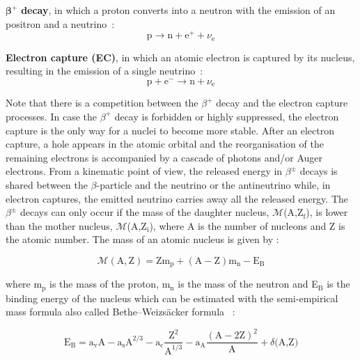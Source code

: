 \documentclass[main.tex]{subfiles}
\begin{document}
\bigskip


\NI $\boldsymbol{\beta^+}$ \textbf{decay}, in which a proton converts into a neutron with the emission of an positron and a neutrino~:
\begin{equation}
\text{p} \rightarrow \text{n} + \text{e}^+ + \nu_\text{e}
\end{equation}  


\bigskip
 
 
\NI \textbf{Electron capture (EC)}, in which an atomic electron is captured by its nucleus, resulting in the emission of a single neutrino~:
\begin{equation}
\text{p} + \text{e}^- \rightarrow \text{n} + \nu_{\text{e}}
\end{equation} 


\bigskip


\NI Note that there is a competition between the $\beta^+$ decay and the electron capture processes. In case the $\beta^+$ decay is forbidden or highly suppressed, the electron capture is the only way for a nuclei to become more stable. After an electron capture, a hole appears in the atomic orbital and the reorganisation of the remaining electrons is accompanied by a cascade of photons and/or Auger electrons. From a kinematic point of view, the released energy in $\beta^{\pm}$ decays is shared between the $\beta$-particle and the neutrino or the antineutrino while, in electron captures, the emitted neutrino carries away all the released energy. The $\beta^{\pm}$ decays can only occur if the mass of the daughter nucleus, $\mathcal{M}$(A,Z$_\text{f}$), is lower than the mother nucleus, $\mathcal{M}$(A,Z$_\text{i}$), where A is the number of nucleons and Z is the atomic number. The mass of an atomic nucleus is given by : 


\begin{equation}\label{eq:Mass}
\mathcal{M} (\text{A},\text{Z}) = \text{Z} \text{m}_\text{p} + (\text{A}-\text{Z}) \text{m}_\text{n} - \text{E}_\text{B}
\end{equation}


\bigskip


\NI where m$_\text{p}$ is the mass of the proton, m$_\text{n}$ is the mass of the neutron and E$_\text{B}$ is the binding energy of the nucleus which can be estimated with the semi-empirical mass formula also called Bethe–Weizsäcker formula~\cite{WeizsckerFormula} :  


\begin{equation}\label{eq:EB}
\text{E}_\text{B} = \text{a}_\text{v} \text{A} - \text{a}_\text{s} \text{A}^{\text{2/3}} -  \text{a}_\text{c} \frac{\text{Z}^\text{2}}{\text{A}^{\text{1/3}}} - \text{a}_\text{A} \frac{(\text{A}-\text{2Z})^\text{2}}{\text{A}} + \delta \text{(A,Z)} 
\end{equation}
\end{document}
